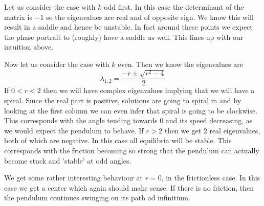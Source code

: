 Let us consider the case with $k$ odd first. In this case the determinant of the matrix is $-1$ so the eigenvalues are real and of opposite sign. We know this will result in a saddle and hence be unstable. In fact around these points we expect the phase portrait to (roughly) have a saddle as well. This lines up with our intuition above.

Now let us consider the case with $k$ even. Then we know the eigenvalues are
$$ \lambda_{1, 2} = \frac{-r \pm \sqrt{r^2 - 4}}{2} $$
If $0 < r < 2$ then we will have complex eigenvalues implying that we will have a spiral. Since the real part is positive, solutions are going to spiral in and by looking at the first column we can even infer that spiral is going to be clockwise. This corresponds with the angle tending towards 0 and its speed decreasing, as we would expect the pendulum to behave. If $r > 2$ then we get 2 real eigenvalues, both of which are negative. In this case all equilibria will be stable. This corresponds with the friction becoming so strong that the pendulum can actually become stuck and 'stable' at odd angles. 

We get some rather interesting behaviour at $r = 0$, in the frictionless case. In this case we get a center which again should make sense. If there is no friction, then the pendulum continues swinging on its path ad infinitium. 